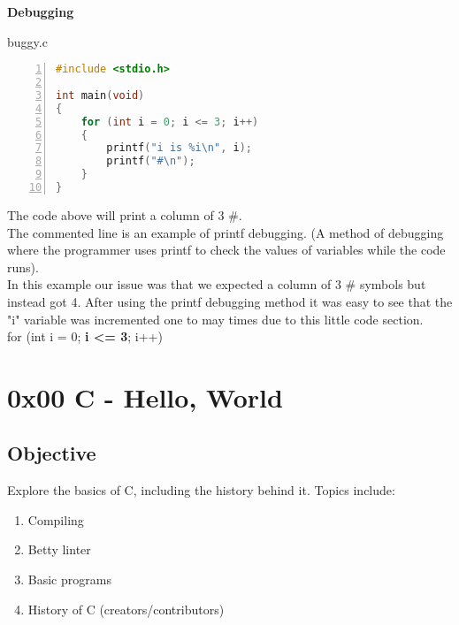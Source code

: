 \documentclass[12pt, letterpaper]{report}
\begin{document}
\textbf{Debugging}

buggy.c
\begin{lstlisting}[language=C,numbers=left,framexleftmargin=5mm,frame=single,xleftmargin=18pt]
#include <stdio.h>

int main(void)
{
	for (int i = 0; i <= 3; i++)
	{
		printf("i is %i\n", i);
		printf("#\n");
	}
}
\end{lstlisting}
The code above will print a column of 3 \#.\\
The commented line is an example of printf debugging. (A method of debugging where the programmer uses printf to check the values of variables while the code runs).\\
In this example our issue was that we expected a column of 3 \# symbols but instead got 4. After using the printf debugging method it was easy to see that the "i" variable 
was incremented one to may times due to this little code section. \\
for (int i = 0; \textbf{i <= 3}; i++)





















\chapter{0x00 C - Hello, World}
\section{Objective}
Explore the basics of C, including the history behind it. Topics include:
\begin{enumerate}
	\item Compiling
	\item Betty linter
	\item Basic programs
	\item History of C (creators/contributors)
\end{enumerate}
\end{document}
